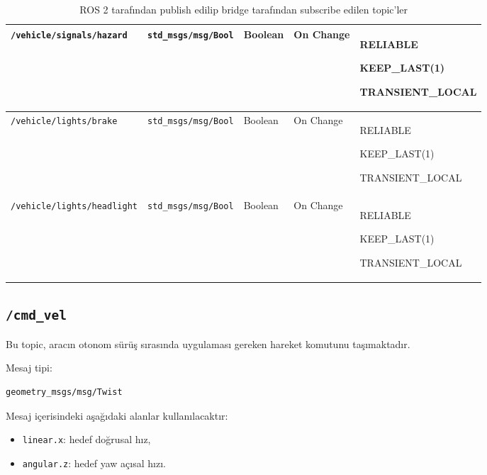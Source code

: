\documentclass[12pt,a4paper]{article}
\begin{document}
\begin{landscape}
\begin{table}[p]
\begin{tabularx}{\linewidth}{
|L{5.2cm}
|L{5.0cm}
|L{4.0cm}
|L{2.2cm}
|Y|
}
\hline

\texttt{/vehicle/signals/hazard}
&
\texttt{std\_msgs/msg/Bool}
&
Boolean
&
On Change
&
RELIABLE

KEEP\_LAST(1)

TRANSIENT\_LOCAL
\\

\hline

\texttt{/vehicle/lights/brake}
&
\texttt{std\_msgs/msg/Bool}
&
Boolean
&
On Change
&
RELIABLE

KEEP\_LAST(1)

TRANSIENT\_LOCAL
\\

\hline

\texttt{/vehicle/lights/headlight}
&
\texttt{std\_msgs/msg/Bool}
&
Boolean
&
On Change
&
RELIABLE

KEEP\_LAST(1)

TRANSIENT\_LOCAL
\\

\hline

\end{tabularx}

\caption{ROS 2 tarafından publish edilip bridge tarafından subscribe edilen topic'ler}

\end{table}

\end{landscape}

\clearpage

\subsection{\texttt{/cmd\_vel}}

Bu topic, aracın otonom sürüş sırasında uygulaması gereken hareket komutunu
taşımaktadır.

Mesaj tipi:

\begin{verbatim}
geometry_msgs/msg/Twist
\end{verbatim}

Mesaj içerisindeki aşağıdaki alanlar kullanılacaktır:

\begin{itemize}
    \item \texttt{linear.x}: hedef doğrusal hız,
    \item \texttt{angular.z}: hedef yaw açısal hızı.
\end{itemize}
\end{document}

